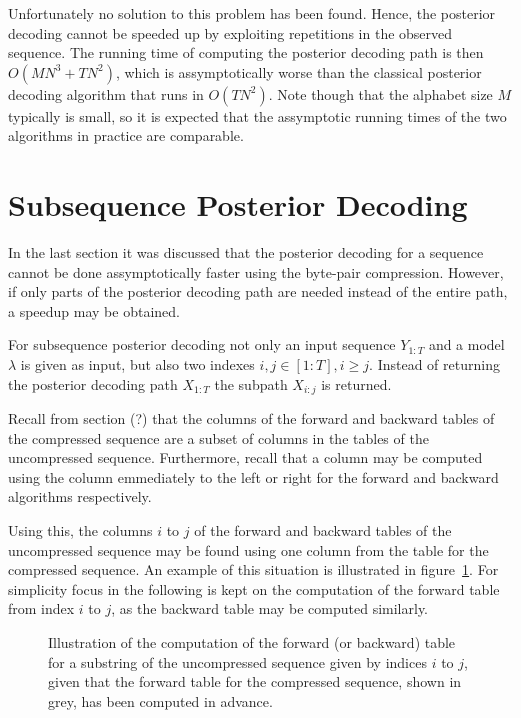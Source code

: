 Unfortunately no solution to this problem has been found. Hence, the posterior
decoding cannot be speeded up by exploiting repetitions in the observed
sequence. The running time of computing the posterior decoding path is then
$O(M N^3 + TN^2)$, which is assymptotically worse than the classical posterior
decoding algorithm that runs in $O(TN^2)$. Note though that the alphabet size
$M$ typically is small, so it is expected that the assymptotic running times of
the two algorithms in practice are comparable.

\section{Subsequence Posterior Decoding}

In the last section it was discussed that the posterior decoding for a sequence
cannot be done assymptotically faster using the byte-pair compression. However,
if only parts of the posterior decoding path are needed instead of the entire
path, a speedup may be obtained.

For subsequence posterior decoding not only an input sequence $Y_{1:T}$ and a
model $\lambda$ is given as input, but also two indexes $i,j \in
[1:T], i \ge j$. Instead of returning the posterior decoding path $X_{1:T}$ the
subpath $X_{i:j}$ is returned.

Recall from section (?) that the columns of the
forward and backward tables of the compressed sequence are a subset of columns
in the tables of the uncompressed sequence. Furthermore, recall that a column
may be computed using the column emmediately to the left or right for the
forward and backward algorithms respectively.

Using this, the columns $i$ to $j$ of the forward and backward tables of the
uncompressed sequence may be found using one column from the table for the
compressed sequence. An example of this situation is illustrated in
figure~\ref{fig:subsequence-posterior}. For simplicity focus in the following
is kept on the computation of the forward table from index $i$ to $j$, as the
backward table may be computed similarly.

\begin{figure}
  \centering
  
  \caption{Illustration of the computation of the forward (or backward) table
    for a substring of the uncompressed sequence given by indices $i$ to $j$,
    given that the forward table for the compressed sequence, shown in grey,
    has been computed in advance.}
  \label{fig:subsequence-posterior}
\end{figure}

